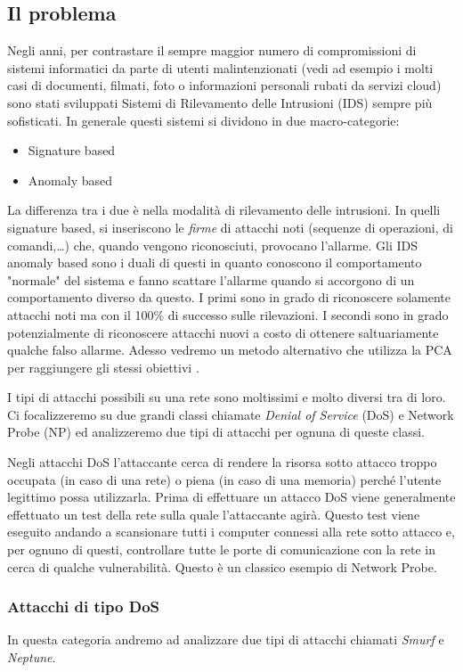 \documentclass[12pt]{article}
\begin{document}
	\subsection{Il problema}
		Negli anni, per contrastare il sempre maggior numero di compromissioni di sistemi informatici da parte di utenti malintenzionati (vedi ad esempio i molti casi di documenti, filmati, foto o informazioni personali rubati da servizi cloud) sono stati sviluppati Sistemi di Rilevamento delle Intrusioni (IDS) sempre più sofisticati. In generale questi sistemi si dividono in due macro-categorie:
		\begin{itemize}
			\item Signature based
			\item Anomaly based
		\end{itemize}
		La differenza tra i due è nella modalità di rilevamento delle intrusioni. In quelli signature based, si inseriscono le \emph{firme} di attacchi noti (sequenze di operazioni, di comandi,\dots ) che, quando vengono riconosciuti, provocano l'allarme. Gli IDS anomaly based sono i duali di questi in quanto conoscono il comportamento "normale" del sistema e fanno scattare l'allarme quando si accorgono di un comportamento diverso da questo. I primi sono in grado di riconoscere solamente attacchi noti ma con il 100\% di successo sulle rilevazioni. I secondi sono in grado potenzialmente di riconoscere attacchi nuovi a costo di ottenere saltuariamente qualche falso allarme. Adesso vedremo un metodo alternativo che utilizza la \ac{PCA} per raggiungere gli stessi obiettivi \cite{Labib2006}.
		
		I tipi di attacchi possibili su una rete sono moltissimi e molto diversi tra di loro. Ci focalizzeremo su due grandi classi chiamate \emph{Denial of Service} (DoS) e Network Probe (NP) ed analizzeremo due tipi di attacchi per ognuna di queste classi.
		
		Negli attacchi DoS l'attaccante cerca di rendere la risorsa sotto attacco troppo occupata (in caso di una rete) o piena (in caso di una memoria) perché l'utente legittimo possa utilizzarla. Prima di effettuare un attacco DoS viene generalmente effettuato un test della rete sulla quale l'attaccante agirà. Questo test viene eseguito andando a scansionare tutti i computer connessi alla rete sotto attacco e, per ognuno di questi, controllare tutte le porte di comunicazione con la rete in cerca di qualche vulnerabilità. Questo è un classico esempio di Network Probe.
		
		\subsubsection{Attacchi di tipo DoS}
			In questa categoria andremo ad analizzare due tipi di attacchi chiamati \emph{Smurf} e \emph{Neptune}. 
			
\end{document}
